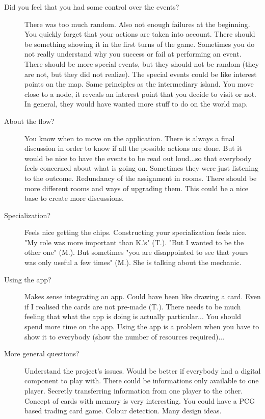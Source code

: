 \documentclass[a4paper,11pt]{report}
\begin{document}
\begin{description}
\item[Did you feel that you had some control over the events?]
There was too much random. Also not enough failures at the beginning. You quickly forget that your actions are taken into account. There should be something showing it in the first turns of the game. Sometimes you do not really understand why you success or fail at performing an event. There should be more special events, but they should not be random (they are not, but they did not realize). The special events could be like interest points on the map. Same principles as the intermediary island. You move close to a node, it reveals an interest point that you decide to visit or not. In general, they would have wanted more stuff to do on the world map.
\item[About the flow?]
You know when to move on the application. There is always a final discussion in order to know if all the possible actions are done. But it would be nice to have the events to be read out loud...so that everybody feels concerned about what is going on. Sometimes they were just listening to the outcome. Redundancy of the assignment in rooms. There should be more different rooms and ways of upgrading them. This could be a nice base to create more discussions.
\item[Specialization?]Feels nice getting the chips. Constructing your specialization feels nice. "My role was more important than K.'s" (T.). "But I wanted to be the other one" (M.). But sometimes "you are disappointed to see that yours was only useful a few times" (M.). She is talking about the mechanic.
\item[Using the app?]Makes sense integrating an app. Could have been like drawing a card. Even if I realised the cards are not pre-made (T.). There needs to be much feeling that what the app is doing is actually particular... You should spend more time on the app. Using the app is a problem when you have to show it to everybody (show the number of resources required)...
\item[More general questions?]Understand the project's issues. Would be better if everybody had a digital component to play with. There could be informations only available to one player. Secretly transferring information from one player to the other. Concept of cards with memory is very interesting. You could have a PCG based trading card game. Colour detection. Many design ideas.
\end{description}
\end{document}
